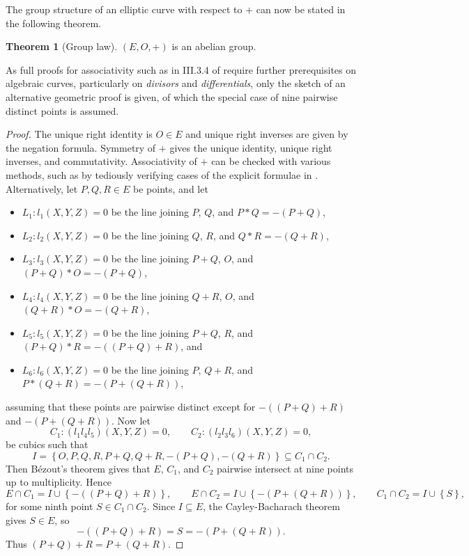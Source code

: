 \documentclass{article}
\newcommand{\rb}[1]{\left( #1 \right)}
\newcommand{\cb}[1]{\left\{ #1 \right\}}
\theoremstyle{definition}\newtheorem*{definition}{Definition}
\theoremstyle{definition}\newtheorem*{example}{Example}
\theoremstyle{definition}\newtheorem*{remark}{Remark}
\newtheorem{theorem}[proposition]{Theorem}
\begin{document}
The group structure of an elliptic curve with respect to $ + $ can now be stated in the following theorem.

\begin{theorem}[Group law]
$ \rb{E, O, +} $ is an abelian group.
\end{theorem}

As full proofs for associativity such as in III.3.4 of \cite{gtm} require further prerequisites on algebraic curves, particularly on \emph{divisors} and \emph{differentials}, only the sketch of an alternative geometric proof is given, of which the special case of nine pairwise distinct points is assumed.

\begin{proof}
The unique right identity is $ O \in E $ and unique right inverses are given by the negation formula. Symmetry of $ + $ gives the unique identity, unique right inverses, and commutativity. Associativity of $ + $ can be checked with various methods, such as by tediously verifying cases of the explicit formulae in \cite{grouplaw}. Alternatively, let $ P, Q, R \in E $ be points, and let
\begin{itemize}
\item $ L_1 : l_1\rb{X, Y, Z} = 0 $ be the line joining $ P $, $ Q $, and $ P * Q = -\rb{P + Q} $,
\item $ L_2 : l_2\rb{X, Y, Z} = 0 $ be the line joining $ Q $, $ R $, and $ Q * R = -\rb{Q + R} $,
\item $ L_3 : l_3\rb{X, Y, Z} = 0 $ be the line joining $ P + Q $, $ O $, and $ \rb{P + Q} * O = -\rb{P + Q} $,
\item $ L_4 : l_4\rb{X, Y, Z} = 0 $ be the line joining $ Q + R $, $ O $, and $ \rb{Q + R} * O = -\rb{Q + R} $,
\item $ L_5 : l_5\rb{X, Y, Z} = 0 $ be the line joining $ P + Q $, $ R $, and $ \rb{P + Q} * R = -\rb{\rb{P + Q} + R} $, and
\item $ L_6 : l_6\rb{X, Y, Z} = 0 $ be the line joining $ P $, $ Q + R $, and $ P * \rb{Q + R} = -\rb{P + \rb{Q + R}} $,
\end{itemize}
assuming that these points are pairwise distinct except for $ -\rb{\rb{P + Q} + R} $ and $ -\rb{P + \rb{Q + R}} $. Now let
$$ C_1 : \rb{l_1l_4l_5}\rb{X, Y, Z} = 0, \qquad C_2 : \rb{l_2l_3l_6}\rb{X, Y, Z} = 0, $$
be cubics such that
$$ I = \cb{O, P, Q, R, P + Q, Q + R, -\rb{P + Q}, -\rb{Q + R}} \subseteq C_1 \cap C_2. $$
Then Bézout's theorem gives that $ E $, $ C_1 $, and $ C_2 $ pairwise intersect at nine points up to multiplicity. Hence
$$ E \cap C_1 = I \cup \cb{-\rb{\rb{P + Q} + R}}, \qquad E \cap C_2 = I \cup \cb{-\rb{P + \rb{Q + R}}}, \qquad C_1 \cap C_2 = I \cup \cb{S}, $$
for some ninth point $ S \in C_1 \cap C_2 $. Since $ I \subseteq E $, the Cayley-Bacharach theorem gives $ S \in E $, so
$$ -\rb{\rb{P + Q} + R} = S = -\rb{P + \rb{Q + R}}. $$
Thus $ \rb{P + Q} + R = P + \rb{Q + R} $.
\end{proof}
\end{document}
